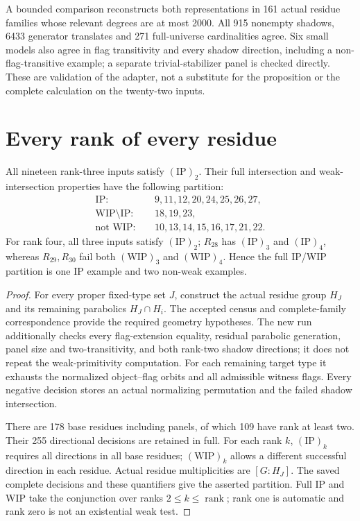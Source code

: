 \documentclass[11pt,a4paper]{article}
\begin{document}
A bounded comparison reconstructs both representations in 161 actual
residue families whose relevant degrees are at most 2000. All 915
nonempty shadows, 6433 generator translates and 271 full-universe
cardinalities agree. Six small models also agree in flag transitivity and
every shadow direction, including a non-flag-transitive example; a
separate trivial-stabilizer panel is checked directly. These are
validation of the adapter, not a substitute for the proposition or the
complete calculation on the twenty-two inputs.

\section{Every rank of every residue}
\begin{theorem}
All nineteen rank-three inputs satisfy $(\mathrm{IP})_2$. Their full
intersection and weak-intersection properties have the following partition:
\begin{align*}
\mathrm{IP}:&\quad9,11,12,20,24,25,26,27,\\
\mathrm{WIP}\setminus\mathrm{IP}:&\quad18,19,23,\\
\text{not }\mathrm{WIP}:&\quad10,13,14,15,16,17,21,22.
\end{align*}
For rank four, all three inputs satisfy $(\mathrm{IP})_2$; $R_{28}$ has
$(\mathrm{IP})_3$ and $(\mathrm{IP})_4$, whereas $R_{29},R_{30}$ fail both
$(\mathrm{WIP})_3$ and $(\mathrm{WIP})_4$. Hence the full IP/WIP partition
is one IP example and two non-weak examples.
\end{theorem}
\begin{proof}
For every proper fixed-type set $J$, construct the actual residue group
$H_J$ and its remaining parabolics $H_J\cap H_i$. The accepted census and
complete-family correspondence provide the required geometry hypotheses.
The new run additionally checks every flag-extension equality, residual
parabolic generation, panel size and two-transitivity, and both rank-two
shadow directions; it does not repeat the weak-primitivity computation.
For each remaining target type it exhausts the normalized object--flag
orbits and all admissible witness flags. Every negative decision stores
an actual normalizing permutation and the failed shadow intersection.

There are 178 base residues including panels, of which 109 have rank at
least two. Their 255 directional decisions are retained in full. For each
rank $k$, $(\mathrm{IP})_k$ requires all directions in all base residues;
$(\mathrm{WIP})_k$ allows a different successful direction in each residue.
Actual residue multiplicities are $[G:H_J]$. The saved complete decisions
and these quantifiers give the asserted partition. Full IP and WIP take
the conjunction over ranks $2\leq k\leq\operatorname{rank}$; rank one is
automatic and rank zero is not an existential weak test.
\end{proof}
\end{document}
